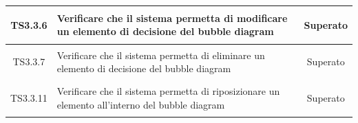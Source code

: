 \documentclass[../PianoDiQualifica.tex]{subfiles}
\begin{document}
\begin{longtable}{|c|>{\centering}p{10cm}|c|}
	\hline
	\hypertarget{TS3.3.6}{TS3.3.6} & Verificare che il sistema permetta di modificare un elemento di decisione del bubble diagram  & Superato \\
	\hline
	\hypertarget{TS3.3.7}{TS3.3.7} & Verificare che il sistema permetta di eliminare un elemento di decisione del bubble diagram & Superato \\
	\hline
	\hypertarget{TS3.3.11}{TS3.3.11} & Verificare che il sistema permetta di riposizionare un elemento all'interno del bubble diagram&Superato \\

\end{longtable}
\end{document}
